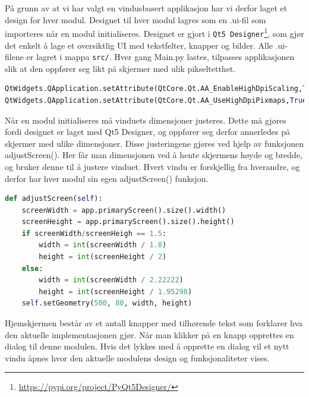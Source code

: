 På grunn av at vi har valgt en vindusbasert applikasjon har vi derfor laget et design for hver modul. Designet til hver modul lagres som en .ui-fil som importeres når en modul initialiseres. Designet er gjort i \texttt{Qt5 Designer}\footnote{\url{https://pypi.org/project/PyQt5Designer/}}, som gjør det enkelt å lage et oversiktlig UI med tekstfelter, knapper og bilder. Alle .ui-filene er lagret i mappa \texttt{src/}. Hver gang Main.py lastes, tilpasses applikasjonen slik at den oppfører seg likt på skjermer med ulik pikseltetthet.

\begin{lstlisting}[language=Python]
QtWidgets.QApplication.setAttribute(QtCore.Qt.AA_EnableHighDpiScaling,True)
QtWidgets.QApplication.setAttribute(QtCore.Qt.AA_UseHighDpiPixmaps,True)
\end{lstlisting}

Når en modul initialiseres må vinduets dimensjoner justeres. Dette må gjøres fordi designet er laget med Qt5 Designer, og oppfører seg derfor annerledes på skjermer med ulike dimensjoner. Disse justeringene gjøres ved hjelp av funksjonen adjustScreen(). Her får man dimensjonen ved å hente skjermens høyde og bredde, og bruker denne til å justere vinduet. Hvert vindu er forskjellig fra hverandre, og derfor har hver modul sin egen adjustScreen() funksjon.

\begin{lstlisting}[language=Python]
def adjustScreen(self):
    screenWidth = app.primaryScreen().size().width()
    screenHeight = app.primaryScreen().size().height()
    if screenWidth/screenHeigh == 1.5:
        width = int(screenWidth / 1.8)
        height = int(screenHeight / 2)
    else:
        width = int(screenWidth / 2.22222)
        height = int(screenHeight / 1.95298)
    self.setGeometry(500, 80, width, height)
\end{lstlisting}
\newpage
Hjemskjermen består av et antall knapper med tilhørende tekst som forklarer hva den aktuelle implementasjonen gjør. Når man klikker på en knapp opprettes en dialog til denne modulen. Hvis det lykkes med å opprette en dialog vil et nytt vindu åpnes hvor den aktuelle modulens design og funksjonaliteter vises. 


